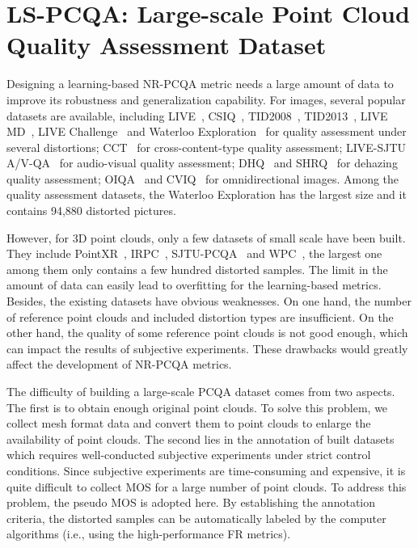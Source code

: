 \documentclass[acmsmall]{acmart}
\begin{document}
\section{LS-PCQA: Large-scale Point Cloud Quality Assessment Dataset}\label{sec:dataset}

\par Designing a learning-based NR-PCQA metric needs a large amount of data to improve its robustness and generalization capability. For images, several popular datasets are available, including LIVE~\cite{LIVE}, CSIQ~\cite{Sheikh2006CSIQ}, TID2008~\cite{Wang2006TID2008}, TID2013~\cite{Ponomarenko2015TID2013}, LIVE MD~\cite{Xue2014LIVEMD}, LIVE Challenge~\cite{Gao2016LIVEChallenge} and Waterloo Exploration~\cite{Ma2017Waterloo} for quality assessment under several distortions; CCT~\cite{Min2017CCT} for cross-content-type quality assessment; LIVE-SJTU A/V-QA~\cite{Min2020AVQA} for audio-visual quality assessment; DHQ~\cite{Min2019DHQ} and SHRQ~\cite{Min2019SHRQ} for dehazing quality assessment; OIQA~\cite{Sui2021OIQA} and CVIQ~\cite{Sun2019CVIQ} for omnidirectional images. Among the quality assessment datasets, the Waterloo Exploration has the largest size and it contains 94,880 distorted pictures.

\par However, for 3D point clouds, only a few datasets of small scale have been built. They include PointXR~\cite{Alexiou2020PointXR}, IRPC~\cite{Javaheri2019IRPC}, SJTU-PCQA~\cite{Yang2020TMM3DTO2D} and WPC~\cite{Su2019WPC,Liu2022WPC}, the largest one among them only contains a few hundred distorted samples. The limit in the amount of data can easily lead to overfitting for the learning-based metrics. Besides, the existing datasets have obvious weaknesses. On one hand, the number of reference point clouds and included distortion types are insufficient. On the other hand, the quality of some reference point clouds is not good enough, which can impact the results of subjective experiments. These drawbacks would greatly affect the development of NR-PCQA metrics.

\par The difficulty of building a large-scale PCQA dataset comes from two aspects. The first is to obtain enough original point clouds. To solve this problem, we collect mesh format data and convert them to point clouds to enlarge the availability of point clouds. The second lies in the annotation of built datasets which requires well-conducted subjective experiments under strict control conditions. Since subjective experiments are time-consuming and expensive, it is quite difficult to collect MOS for a large number of point clouds. To address this problem, the pseudo MOS is adopted here. By establishing the annotation criteria, the distorted samples can be automatically labeled by the computer algorithms (i.e., using the high-performance FR metrics).
\end{document}
